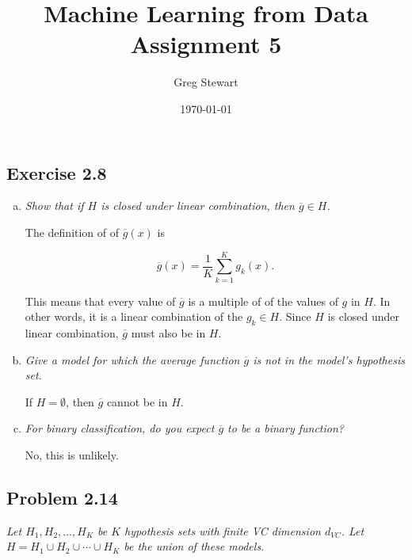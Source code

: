 \documentclass{article}
\title{Machine Learning from Data Assignment 5}
\author{Greg Stewart}
\date{\today}
\begin{document}
\maketitle

\subsection*{Exercise 2.8}

\begin{enumerate}[(a)]
  \item \textit{Show that if $H$ is closed under linear combination, then $\overline{g} \in H$.}

    The definition of of $\overline{g}(x)$ is 
      
      $$\overline{g}(x) = \frac{1}{K}\sum_{k=1}^{K} g_k(x).$$

    This means that every value of $\overline{g}$ is a multiple of of the values of $g$ in $H$.
    In other words, it is a linear combination of the $g_k \in H$. Since $H$ is closed under
    linear combination, $\overline{g}$ must also be in $H$.

  \item \textit{Give a model for which the average function $\overline{g}$ is not in the model's
    hypothesis set.}

    If $H = \emptyset$, then $\overline{g}$ cannot be in $H$.

  \item \textit{For binary classification, do you expect $\overline{g}$ to be a binary function?}

    No, this is unlikely.

\end{enumerate}



\subsection*{Problem 2.14}

\textit{Let $H_1, H_2, \dots, H_K$ be $K$ hypothesis sets with finite VC dimension $d_{VC}$.
Let $H = H_1 \cup H_2 \cup \cdots \cup H_K$ be the union of these models.}
\end{document}

